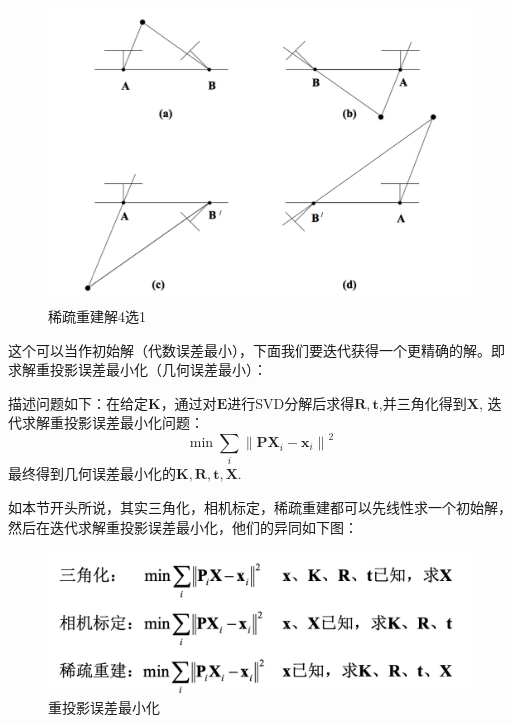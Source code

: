\documentclass[12pt]{article}
\begin{document}
\begin{figure}[ht]
    \centering
    \includegraphics[scale=0.6]{./img/xscj1.png}
    \caption{稀疏重建解4选1}
    \label{fig:xscj1}
\end{figure}

这个可以当作初始解（代数误差最小），下面我们要迭代获得一个更精确的解。即求解重投影误差最小化（几何误差最小）：

描述问题如下：在给定$\mathbf{K}$，通过对$\mathbf{E}$进行SVD分解后求得$\mathbf{R,t}$,并三角化得到$\mathbf{X}$,
迭代求解重投影误差最小化问题：
\begin{equation}
    \nonumber
    \min \sum_{i}\left\|\mathbf{P X}_{i}-\mathbf{x}_{i}\right\|^{2}
\end{equation}
最终得到几何误差最小化的$\mathbf{K,R,t,X}$.

如本节开头所说，其实三角化，相机标定，稀疏重建都可以先线性求一个初始解，然后在迭代求解重投影误差最小化，他们的异同如下图：

\begin{figure}[ht]
    \centering
    \includegraphics[scale=0.4]{./img/xscj2.png}
    \caption{重投影误差最小化}
    \label{fig:xscj2}
\end{figure}
\end{document}
